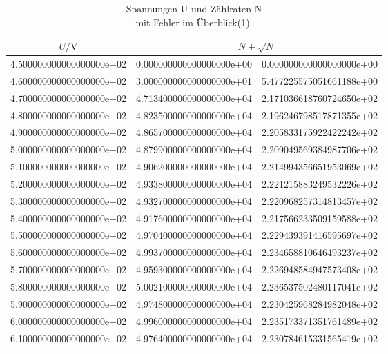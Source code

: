\begin{table}
\parbox[t]{0.48\textwidth}{
  \centering
  \caption{Spannungen U und Zählraten N \\ mit Fehler im Überblick(1).}
  \begin{tabular}{S[scientific-notation = fixed , fixed-exponent = 0] S[scientific-notation = fixed , fixed-exponent = 0]@{$\pm\qquad$ } S[scientific-notation = fixed , fixed-exponent = 0]}
  \toprule
  $U / \si{\volt}$ &  \\
  \midrule
  4.500000000000000000e+02 & 0.000000000000000000e+00 & 0.000000000000000000e+00\\
  4.600000000000000000e+02 & 3.000000000000000000e+01 & 5.477225575051661188e+00\\
  4.700000000000000000e+02 & 4.713400000000000000e+04 & 2.171036618760724650e+02\\
  4.800000000000000000e+02 & 4.823500000000000000e+04 & 2.196246798517871355e+02\\
  4.900000000000000000e+02 & 4.865700000000000000e+04 & 2.205833175922422242e+02\\
  5.000000000000000000e+02 & 4.879900000000000000e+04 & 2.209049569384987706e+02\\
  5.100000000000000000e+02 & 4.906200000000000000e+04 & 2.214994356651953069e+02\\
  5.200000000000000000e+02 & 4.933800000000000000e+04 & 2.221215883249532226e+02\\
  5.300000000000000000e+02 & 4.932700000000000000e+04 & 2.220968257314813457e+02\\
  5.400000000000000000e+02 & 4.917600000000000000e+04 & 2.217566233509159588e+02\\
  5.500000000000000000e+02 & 4.970400000000000000e+04 & 2.229439391416595697e+02\\
  5.600000000000000000e+02 & 4.993700000000000000e+04 & 2.234658810646493237e+02\\
  5.700000000000000000e+02 & 4.959300000000000000e+04 & 2.226948584947573408e+02\\
  5.800000000000000000e+02 & 5.002100000000000000e+04 & 2.236537502480117041e+02\\
  5.900000000000000000e+02 & 4.974800000000000000e+04 & 2.230425968284982048e+02\\
  6.000000000000000000e+02 & 4.996000000000000000e+04 & 2.235173371351761489e+02\\
  6.100000000000000000e+02 & 4.976400000000000000e+04 & 2.230784615331565419e+02\\

\end{tabular}}
\end{table}
